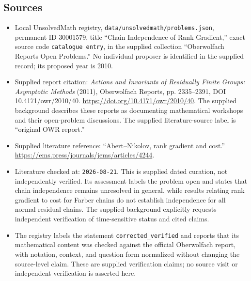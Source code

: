 \documentclass[11pt]{article}
\begin{document}
\subsection{Sources}
\begin{itemize}
\item Local UnsolvedMath registry, \texttt{data/unsolvedmath/problems.json}, permanent ID \(30001579\), title ``Chain Independence of Rank Gradient,'' exact source code \texttt{catalogue entry}, in the supplied collection ``Oberwolfach Reports Open Problems.'' No individual proposer is identified in the supplied record; its proposed year is 2010.
\item Supplied report citation: \emph{Actions and Invariants of Residually Finite Groups: Asymptotic Methods} (2011), Oberwolfach Reports, pp. 2335--2391, DOI 10.4171/owr/2010/40. \url{https://doi.org/10.4171/owr/2010/40}. The supplied background describes these reports as documenting mathematical workshops and their open-problem discussions. The supplied literature-source label is ``original OWR report.''
\item Supplied literature reference: ``Abert--Nikolov, rank gradient and cost.'' \url{https://ems.press/journals/jems/articles/4244}.
\item Literature checked at: \texttt{2026-08-21}. This is supplied dated curation, not independently verified. Its assessment labels the problem open and states that chain independence remains unresolved in general, while results relating rank gradient to cost for Farber chains do not establish independence for all normal residual chains. The supplied background explicitly requests independent verification of time-sensitive status and cited claims.
\item The registry labels the statement \texttt{corrected\_verified} and reports that its mathematical content was checked against the official Oberwolfach report, with notation, context, and question form normalized without changing the source-level claim. These are supplied verification claims; no source visit or independent verification is asserted here.
\end{itemize}
\end{document}
